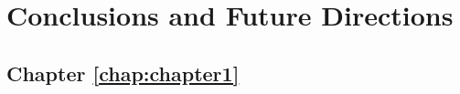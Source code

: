 \chapter{Conclusions and Future Directions}
\label{chap:chapter5}
\section{Chapter \ref{chap:chapter1}}